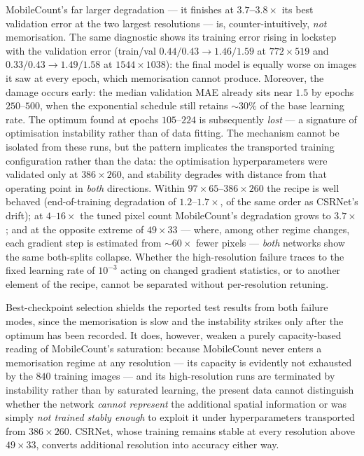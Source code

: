 MobileCount's far larger degradation — it finishes at
\textbf{$3.7$--$3.8\times$} its best validation error at the two
largest resolutions — is, counter-intuitively, \emph{not}
memorisation. The same diagnostic shows its training error rising in
lockstep with the validation error (train/val $0.44/0.43 \rightarrow
1.46/1.59$ at $772\times519$ and $0.33/0.43 \rightarrow 1.49/1.58$ at
$1544\times1038$): the final model is equally worse on images it saw
at every epoch, which memorisation cannot produce. Moreover, the
damage occurs early: the median validation MAE already sits near
$1.5$ by epochs $250$--$500$, when the exponential schedule still
retains ${\sim}30\%$ of the base learning rate. The optimum found at
epochs $105$--$224$ is subsequently \emph{lost} — a signature of
optimisation instability rather than of data fitting. The mechanism
cannot be isolated from these runs, but the pattern implicates the
transported training configuration rather than the data: the
optimisation hyperparameters were validated only at $386\times260$,
and stability degrades with distance from that operating point in
\emph{both} directions. Within $97\times65$--$386\times260$ the recipe
is well behaved (end-of-training degradation of $1.2$--$1.7\times$, of
the same order as CSRNet's drift); at $4$--$16\times$ the tuned pixel
count MobileCount's degradation grows to $3.7\times$; and at the
opposite extreme of $49\times33$ — where, among other regime changes,
each gradient step is estimated from ${\sim}60\times$ fewer pixels —
\emph{both} networks show the same both-splits collapse. Whether the
high-resolution failure traces to the fixed learning rate of $10^{-3}$
acting on changed gradient statistics, or to another element of the
recipe, cannot be separated without per-resolution retuning.

Best-checkpoint selection shields the reported test results from both
failure modes, since the memorisation is slow and the instability
strikes only after the optimum has been recorded. It does, however,
weaken a purely capacity-based reading of MobileCount's saturation:
because MobileCount never enters a memorisation regime at any
resolution — its capacity is evidently not exhausted by the $840$
training images — and its high-resolution runs are terminated by
instability rather than by saturated learning, the present data cannot
distinguish whether the network \emph{cannot represent} the additional
spatial information or was simply \emph{not trained stably enough} to
exploit it under hyperparameters transported from $386\times260$.
CSRNet, whose training remains stable at every resolution above
$49\times33$, converts additional resolution into accuracy either way.
